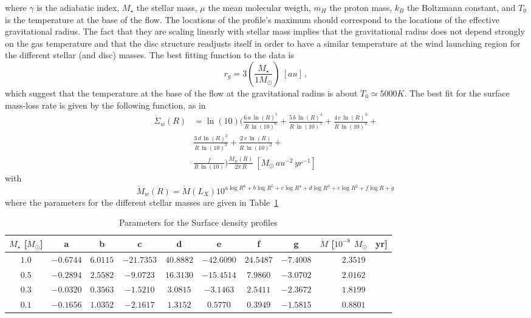 \documentclass{aa}
\begin{document}
where $\gamma$ is the adiabatic index, $M_\star$ the stellar mass, $\mu$ the mean molecular weigth, $m_H$ the proton mass, $k_B$ the Boltzmann constant, and $T_0$ is the temperature at the base of the flow.
The locations of the profile's maximum should correspond to the locations of the effective gravitational radius. The fact that they are scaling linearly with stellar mass implies that the gravitational radius does not depend strongly on the gas temperature and that the disc structure readjusts itself in order to have a similar temperature at the wind launching region for the different stellar (and disc) masses.
The best fitting function to the data is
\begin{equation}\label{eq:rg_sim}
  r_g = 3 \left(\frac{M_\star}{1 M_\odot}\right) \ [au]\,,
\end{equation}
which suggest that the temperature at the base of the flow at the gravitational radius is about $T_0 \simeq 5000 K$.
The best fit for the surface mass-loss rate is given by the following function, as in 
\begin{eqnarray}
  \dot{\Sigma}_w(R) &= \ln{(10)} \bigg(\frac{6\, a\, \ln{(R)}^5}{R\, \ln{(10)}^6} +
  \frac{5\, b\, \ln{(R)}^4}{R\, \ln{(10)}^5} +
  \frac{4\, c\, \ln{(R)}^3}{R\, \ln{(10)}^4} + \\ \nonumber
  &\frac{3\, d\, \ln{(R)}^2}{R\, \ln{(10)}^3} +
  \frac{2\, e\, \ln{(R)}}{R\, \ln{(10)}^2} + \\ \nonumber
  &\frac{f}{R\, \ln{(10)}}\bigg)
  \frac{\dot{M}_w(R)}{2\pi\, R} \ [M_\odot\, {au}^{-2}\, {yr}^{-1}]\,
\end{eqnarray}
with
\begin{equation}
  \dot{M}_w(R) = \dot{M}(L_X) 10^{a\log{R}^6 + b\log{R}^5 + c\log{R}^4 + d\log{R}^3 + e\log{R}^2 + f\log{R} + g}\,
\end{equation}
where the parameters for the different stellar masses are given in Table~\ref{tab:fit}
\begin{table}
\caption{Parameters for the Surface density profiles}
\label{tab:fit}
\centering
\begin{tabular}{c c c c c c c c c}
\hline
$M_\star$ [$M_\odot$] & a & b & c & d & e & f & g & $\dot{M}$ [$10^{-8}$ $M_\odot$ \ yr]\\
\hline
\hline
   $1.0$ & $-0.6744$ & $6.0115$ & $-21.7353$ & $40.8882$ & $-42.6090$ & $24.5487$ & $-7.4008$ & $2.3519$\\
   $0.5$ & $-0.2894$ & $2.5582$ & $-9.0723$ & $16.3130$ & $-15.4514$ & $7.9860$ & $-3.0702$ & $2.0162$\\
   $0.3$ & $-0.0320$ & $0.3563$ & $-1.5210$ & $3.0815$ & $-3.1463$ & $2.5411$ & $-2.3672$ & $1.8199$\\
   $0.1$ & $-0.1656$ & $1.0352$ & $-2.1617$ & $1.3152$ & $0.5770$ & $0.3949$ & $-1.5815$ & $0.8801$\\
\hline
\end{tabular}
\end{table}
\end{document}
